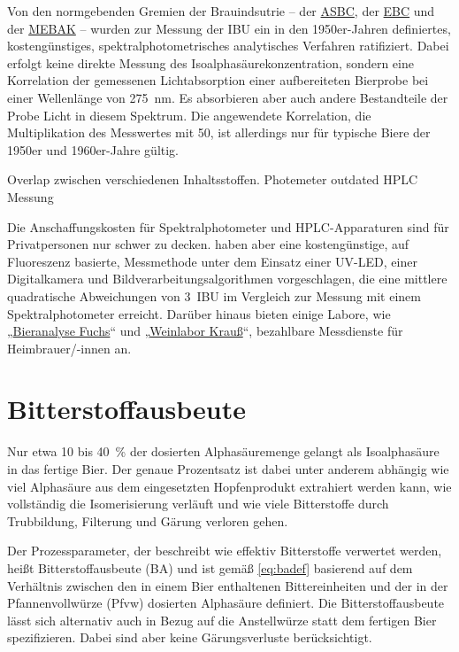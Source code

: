 \documentclass[a4paper,parskip=half]{scrartcl}
\begin{document}
Von den normgebenden Gremien der Brauindsutrie – der \href{https://www.asbcnet.org}{ASBC}, der \href{https://europeanbreweryconvention.eu}{EBC} und der \href{https://www.mebak.org}{MEBAK} – wurden zur Messung der IBU ein in den 1950er-Jahren definiertes,  kostengünstiges, spektralphotometrisches analytisches Verfahren ratifiziert. Dabei erfolgt keine direkte Messung des Isoalphasäurekonzentration, sondern eine Korrelation der gemessenen Lichtabsorption einer aufbereiteten Bierprobe bei einer Wellenlänge von 275~nm. Es absorbieren aber auch andere Bestandteile der Probe Licht in diesem Spektrum. Die angewendete Korrelation, die Multiplikation des Messwertes mit 50, ist allerdings nur für typische Biere der 1950er und 1960er-Jahre gültig. \parencites{ASBC2011}{Hosom2017}

\parencite[5\psq]{Malowicki2005}
Overlap zwischen verschiedenen Inhaltsstoffen. Photemeter outdated HPLC Messung 

Die Anschaffungskosten für Spektralphotometer und HPLC-Apparaturen sind für Privatpersonen nur schwer zu decken. \textcite{Calado2019} haben aber eine kostengünstige, auf Fluoreszenz basierte, Messmethode unter dem Einsatz einer UV-LED, einer Digitalkamera und Bildverarbeitungsalgorithmen vorgeschlagen, die eine mittlere quadratische Abweichungen von 3~IBU im Vergleich zur Messung mit einem Spektralphotometer erreicht. Darüber hinaus bieten einige Labore, wie „\href{https://bieranalyse.de}{Bieranalyse Fuchs}“ und „\href{https://www.weinlabor-krauss.de}{Weinlabor Krauß}“, bezahlbare Messdienste für Heimbrauer/-innen an.


\section*{Bitterstoffausbeute}

Nur etwa 10 bis 40~\% der dosierten Alphasäuremenge gelangt als Isoalphasäure in das fertige Bier. Der genaue Prozentsatz ist dabei unter anderem abhängig wie viel Alphasäure aus dem eingesetzten Hopfenprodukt extrahiert werden kann, wie vollständig die Isomerisierung verläuft und wie viele Bitterstoffe durch Trubbildung, Filterung und Gärung verloren gehen. \parencite[9]{Malowicki2005}

Der Prozessparameter, der beschreibt wie effektiv Bitterstoffe verwertet werden, heißt Bitterstoffausbeute (BA) und ist gemäß \autoref{eq:badef} basierend auf dem Verhältnis zwischen den in einem Bier enthaltenen Bittereinheiten und der in der Pfannenvollwürze (Pfvw) dosierten Alphasäure definiert. Die Bitterstoffausbeute lässt sich alternativ auch in Bezug auf die Anstellwürze statt dem fertigen Bier spezifizieren. Dabei sind aber keine Gärungsverluste berücksichtigt. \parencite[163]{Annemueller2015} 
\end{document}
